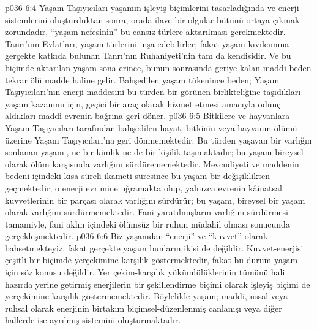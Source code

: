 \vs p036 6:4 Yaşam Taşıyıcıları yaşamın işleyiş biçimlerini tasarladığında ve enerji sistemlerini oluşturduktan sonra, orada ilave bir olgular bütünü ortaya çıkmak zorundadır, “yaşam nefesinin” bu cansız türlere aktarılması gerekmektedir. Tanrı’nın Evlatları, yaşam türlerini inşa edebilirler; fakat yaşam kıvılcımına gerçekte katkıda bulunan Tanrı’nın Ruhaniyeti’nin tam da kendisidir. Ve bu biçimde aktarılan yaşam sona erince, bunun sonrasında geriye kalan maddi beden tekrar ölü madde haline gelir. Bahşedilen yaşam tükenince beden; Yaşam Taşıyıcıları’nın enerji\hyp{}maddesini bu türden bir görünen birlikteliğine taşıdıkları yaşam kazanımı için, geçici bir araç olarak hizmet etmesi amacıyla ödünç aldıkları maddi evrenin bağrına geri döner.
\vs p036 6:5 Bitkilere ve hayvanlara Yaşam Taşıyıcıları tarafından bahşedilen hayat, bitkinin veya hayvanın ölümü üzerine Yaşam Taşıyıcıları’na geri dönmemektedir. Bu türden yaşayan bir varlığın sonlanan yaşamı, ne bir kimlik ne de bir kişilik taşımaktadır; bu yaşam bireysel olarak ölüm karşısında varlığını sürdürememektedir. Mevcudiyeti ve maddenin bedeni içindeki kısa süreli ikameti süresince bu yaşam bir değişiklikten geçmektedir; o enerji evrimine uğramakta olup, yalnızca evrenin kâinatsal kuvvetlerinin bir parçası olarak varlığını sürdürür; bu yaşam, bireysel bir yaşam olarak varlığını sürdürmemektedir. Fani yaratılmışların varlığını sürdürmesi tamamiyle, fani aklın içindeki ölümsüz bir ruhun müdahil olması sonucunda gerçekleşmektedir.
\vs p036 6:6 Biz yaşamdan “enerji” ve “kuvvet” olarak bahsetmekteyiz, fakat gerçekte yaşam bunların ikisi de değildir. Kuvvet\hyp{}enerjisi çeşitli bir biçimde yerçekimine karşılık göstermektedir, fakat bu durum yaşam için söz konusu değildir. Yer çekim\hyp{}karşılık yükümlülüklerinin tümünü hali hazırda yerine getirmiş enerjilerin bir şekillendirme biçimi olarak işleyiş biçimi de yerçekimine karşılık göstermemektedir. Böylelikle yaşam; maddi, ussal veya ruhsal olarak enerjinin birtakım biçimsel\hyp{}düzenlenmiş canlanışı veya diğer hallerde ise ayrılmış sistemini oluşturmaktadır.
